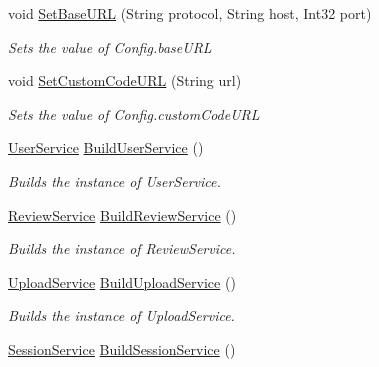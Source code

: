 \begin{DoxyCompactItemize}
void \hyperlink{classcom_1_1shephertz_1_1app42_1_1paas_1_1sdk_1_1csharp_1_1_service_a_p_i_a7426112cd66a419891ece1fe6eae62cd}{Set\+Base\+U\+R\+L} (String protocol, String host, Int32 port)
\begin{DoxyCompactList}\small\item\em Sets the value of Config.\+base\+U\+R\+L \end{DoxyCompactList}\item 
void \hyperlink{classcom_1_1shephertz_1_1app42_1_1paas_1_1sdk_1_1csharp_1_1_service_a_p_i_a8032a67d2bf3f29c3e97ea4e5059e54b}{Set\+Custom\+Code\+U\+R\+L} (String url)
\begin{DoxyCompactList}\small\item\em Sets the value of Config.\+custom\+Code\+U\+R\+L \end{DoxyCompactList}\item 
\hyperlink{classcom_1_1shephertz_1_1app42_1_1paas_1_1sdk_1_1csharp_1_1user_1_1_user_service}{User\+Service} \hyperlink{classcom_1_1shephertz_1_1app42_1_1paas_1_1sdk_1_1csharp_1_1_service_a_p_i_ae6d47672efa6a015b3f405be525daf3b}{Build\+User\+Service} ()
\begin{DoxyCompactList}\small\item\em Builds the instance of User\+Service. \end{DoxyCompactList}\item 
\hyperlink{classcom_1_1shephertz_1_1app42_1_1paas_1_1sdk_1_1csharp_1_1review_1_1_review_service}{Review\+Service} \hyperlink{classcom_1_1shephertz_1_1app42_1_1paas_1_1sdk_1_1csharp_1_1_service_a_p_i_ac3c10275a3470e8c0798627fbcc6cbc0}{Build\+Review\+Service} ()
\begin{DoxyCompactList}\small\item\em Builds the instance of Review\+Service. \end{DoxyCompactList}\item 
\hyperlink{classcom_1_1shephertz_1_1app42_1_1paas_1_1sdk_1_1csharp_1_1upload_1_1_upload_service}{Upload\+Service} \hyperlink{classcom_1_1shephertz_1_1app42_1_1paas_1_1sdk_1_1csharp_1_1_service_a_p_i_a4ba4121609421b749748755c2ce2a79b}{Build\+Upload\+Service} ()
\begin{DoxyCompactList}\small\item\em Builds the instance of Upload\+Service. \end{DoxyCompactList}\item 
\hyperlink{classcom_1_1shephertz_1_1app42_1_1paas_1_1sdk_1_1csharp_1_1session_1_1_session_service}{Session\+Service} \hyperlink{classcom_1_1shephertz_1_1app42_1_1paas_1_1sdk_1_1csharp_1_1_service_a_p_i_ac5d47a1591d73a1ac642ba4650b0f8bb}{Build\+Session\+Service} ()

\end{DoxyCompactItemize}
